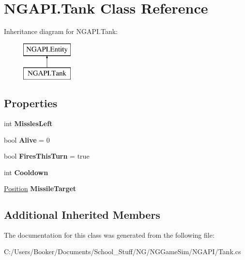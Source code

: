 \hypertarget{class_n_g_a_p_i_1_1_tank}{}\section{N\+G\+A\+P\+I.\+Tank Class Reference}
\label{class_n_g_a_p_i_1_1_tank}
Inheritance diagram for N\+G\+A\+P\+I.\+Tank\+:\begin{figure}[H]
\begin{center}
\leavevmode
\includegraphics[height=2.000000cm]{class_n_g_a_p_i_1_1_tank}
\end{center}
\end{figure}
\subsection*{Properties}
\begin{DoxyCompactItemize}
\item 
\mbox{\label{class_n_g_a_p_i_1_1_tank_a75ec575813d7fb97d47b5e5ff63ecddc}} 
int {\bfseries Missles\+Left}
\item 
\mbox{\label{class_n_g_a_p_i_1_1_tank_adbfec61aae6a17cd2b56384c46ca84c6}} 
bool {\bfseries Alive} = 0
\item 
\mbox{\label{class_n_g_a_p_i_1_1_tank_a5dad81402c3443b0688e215e20066f7a}} 
bool {\bfseries Fires\+This\+Turn} = true
\item 
\mbox{\label{class_n_g_a_p_i_1_1_tank_a59e6fe5c416fc64aa2cdfa45722969e0}} 
int {\bfseries Cooldown}
\item 
\mbox{\label{class_n_g_a_p_i_1_1_tank_a3200148a7f2ae87094cec9034c965ee3}} 
\hyperlink{struct_n_g_a_p_i_1_1_position}{Position} {\bfseries Missile\+Target}
\end{DoxyCompactItemize}
\subsection*{Additional Inherited Members}


The documentation for this class was generated from the following file\+:\begin{DoxyCompactItemize}
\item 
C\+:/\+Users/\+Booker/\+Documents/\+School\+\_\+\+Stuff/\+N\+G/\+N\+G\+Game\+Sim/\+N\+G\+A\+P\+I/Tank.\+cs\end{DoxyCompactItemize}
